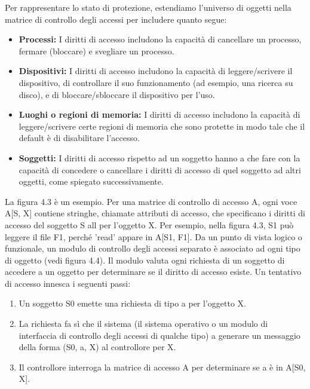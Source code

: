 \singlespacing

Per rappresentare lo stato di protezione, estendiamo l'universo di oggetti nella matrice di controllo degli accessi per includere quanto segue:

\begin{itemize}
    \item \textbf{Processi:} I diritti di accesso includono la capacità di cancellare un processo, fermare (bloccare) e svegliare un processo.

    \item \textbf{Dispositivi:} I diritti di accesso includono la capacità di leggere/scrivere il dispositivo, di controllare il suo funzionamento (ad esempio, una ricerca su disco), e di bloccare/sbloccare il dispositivo per l'uso.
    
    \item \textbf{Luoghi o regioni di memoria:} I diritti di accesso includono la capacità di leggere/scrivere certe regioni di memoria che sono protette in modo tale che il default è di disabilitare l'accesso.
    
    \item \textbf{Soggetti:} I diritti di accesso rispetto ad un soggetto hanno a che fare con la capacità di concedere o cancellare i diritti di accesso di quel soggetto ad altri oggetti, come spiegato successivamente.
\end{itemize}

La figura 4.3 è un esempio. Per una matrice di controllo di accesso A, ogni voce A[S, X] contiene stringhe, chiamate attributi di accesso, che specificano i diritti di accesso del soggetto S all per l'oggetto X. Per esempio, nella figura 4.3, S1 può leggere il file F1, perché 'read' appare in A[S1, F1]. Da un punto di vista logico o funzionale, un modulo di controllo degli accessi separato è associato ad ogni tipo di oggetto (vedi figura 4.4). Il modulo valuta ogni richiesta di un soggetto di accedere a un oggetto per determinare se il diritto di accesso esiste. Un tentativo di accesso innesca i seguenti passi:
\begin{enumerate}
    \item Un soggetto S0 emette una richiesta di tipo a per l'oggetto X.
    
    \item La richiesta fa sì che il sistema (il sistema operativo o un modulo di interfaccia di controllo degli accessi di qualche tipo) a generare un messaggio della forma (S0, a, X) al controllore per X.
    
    \item Il controllore interroga la matrice di accesso A per determinare se a è in A[S0, X].
\end{enumerate}

